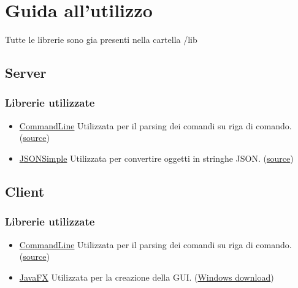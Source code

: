 \chapter*{Guida all'utilizzo}

Tutte le librerie sono gia presenti nella cartella /lib

\section*{Server}

\subsection*{Librerie utilizzate}
\begin{itemize}
    \item \href{http://search.maven.org/remotecontent?filepath=com/github/jankroken/commandline/1.7.0/commandline-1.7.0.jar}{CommandLine} Utilizzata per il parsing dei comandi su riga di comando. (\href{https://github.com/jankroken/commandline}{source})
    \item \href{https://storage.googleapis.com/google-code-archive-downloads/v2/code.google.com/json-simple/json-simple-1.1.1.jar}{JSONSimple} Utilizzata per convertire oggetti in stringhe JSON. (\href{https://github.com/fangyidong/json-simple}{source})
\end{itemize}


\section*{Client}

\subsection*{Librerie utilizzate}
\begin{itemize}
    \item \href{http://search.maven.org/remotecontent?filepath=com/github/jankroken/commandline/1.7.0/commandline-1.7.0.jar}{CommandLine} Utilizzata per il parsing dei comandi su riga di comando. (\href{https://github.com/jankroken/commandline}{source})
    \item \href{https://gluonhq.com/download/javafx-11-0-2-sdk-linux/}{JavaFX} Utilizzata per la creazione della GUI. (\href{https://gluonhq.com/download/javafx-11-0-2-sdk-windows/}{Windows download})
\end{itemize}
